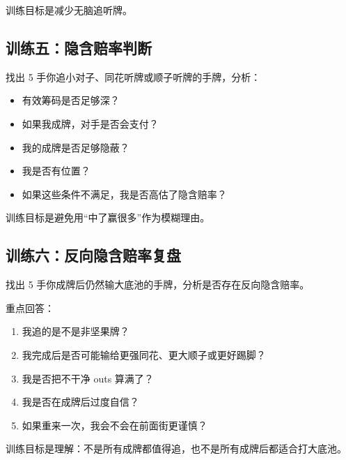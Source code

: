 训练目标是减少无脑追听牌。

\subsection*{训练五：隐含赔率判断}

找出 5 手你追小对子、同花听牌或顺子听牌的手牌，分析：

\begin{itemize}
\item 有效筹码是否足够深？
\item 如果我成牌，对手是否会支付？
\item 我的成牌是否足够隐蔽？
\item 我是否有位置？
\item 如果这些条件不满足，我是否高估了隐含赔率？
\end{itemize}

训练目标是避免用“中了赢很多”作为模糊理由。

\subsection*{训练六：反向隐含赔率复盘}

找出 5 手你成牌后仍然输大底池的手牌，分析是否存在反向隐含赔率。

重点回答：

\begin{enumerate}
\item 我追的是不是非坚果牌？
\item 我完成后是否可能输给更强同花、更大顺子或更好踢脚？
\item 我是否把不干净 outs 算满了？
\item 我是否在成牌后过度自信？
\item 如果重来一次，我会不会在前面街更谨慎？
\end{enumerate}

训练目标是理解：不是所有成牌都值得追，也不是所有成牌后都适合打大底池。
